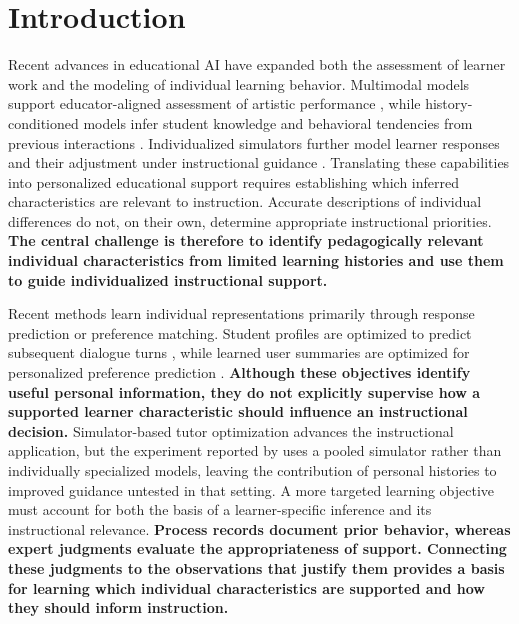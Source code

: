 \section{Introduction}

Recent advances in educational AI have expanded both the assessment of learner work and the modeling of individual learning behavior. Multimodal models support educator-aligned assessment of artistic performance \citep{ye2026multimodal}, while history-conditioned models infer student knowledge and behavioral tendencies from previous interactions \citep{duan2026history}. Individualized simulators further model learner responses and their adjustment under instructional guidance \citep{yang2026simulator}. Translating these capabilities into personalized educational support requires establishing which inferred characteristics are relevant to instruction. Accurate descriptions of individual differences do not, on their own, determine appropriate instructional priorities. \textbf{The central challenge is therefore to identify pedagogically relevant individual characteristics from limited learning histories and use them to guide individualized instructional support.}

Recent methods learn individual representations primarily through response prediction or preference matching. Student profiles are optimized to predict subsequent dialogue turns \citep{duan2026history}, while learned user summaries are optimized for personalized preference prediction \citep{nam2026summaries}. \textbf{Although these objectives identify useful personal information, they do not explicitly supervise how a supported learner characteristic should influence an instructional decision.} Simulator-based tutor optimization advances the instructional application, but the experiment reported by \citet{yang2026simulator} uses a pooled simulator rather than individually specialized models, leaving the contribution of personal histories to improved guidance untested in that setting. A more targeted learning objective must account for both the basis of a learner-specific inference and its instructional relevance. \textbf{Process records document prior behavior, whereas expert judgments evaluate the appropriateness of support. Connecting these judgments to the observations that justify them provides a basis for learning which individual characteristics are supported and how they should inform instruction.}

